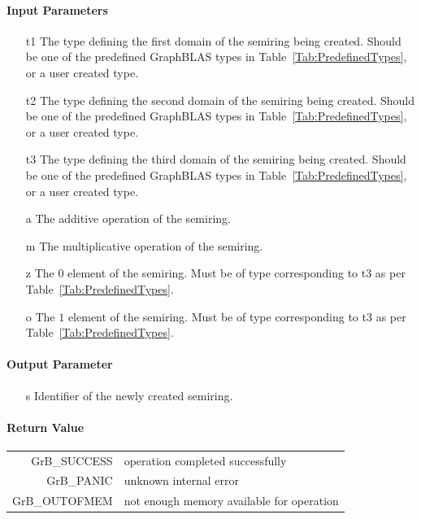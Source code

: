 \documentclass[11pt]{extarticle}
\begin{document}
\paragraph{Input Parameters}

\begin{itemize}
	\item[{\sf t1}] The type defining the first domain of the semiring being created. Should be one of the predefined
	GraphBLAS types in Table~\ref{Tab:PredefinedTypes}, or a user created type.
	\item[{\sf t2}] The type defining the second domain of the semiring being created. Should be one of the predefined
	GraphBLAS types in Table~\ref{Tab:PredefinedTypes}, or a user created type.
	\item[{\sf t3}] The type defining the third domain of the semiring being created. Should be one of the predefined
	GraphBLAS types in Table~\ref{Tab:PredefinedTypes}, or a user created type.
	\item[{\sf a}] The additive operation of the semiring.
	\item[{\sf m}] The multiplicative operation of the semiring.
	\item[{\sf z}] The $0$ element of the semiring. Must be of type corresponding to {\sf t3} as per Table~\ref{Tab:PredefinedTypes}.
	\item[{\sf o}] The $1$ element of the semiring. Must be of type corresponding to {\sf t3} as per Table~\ref{Tab:PredefinedTypes}.
\end{itemize}

\paragraph{Output Parameter}

\begin{itemize}
	\item[{\sf s}] Identifier of the newly created semiring.
\end{itemize}

\paragraph{Return Value}

\begin{tabular}{rl} 
{\sf GrB\_SUCCESS} 	& operation completed successfully \\
{\sf GrB\_PANIC}	& unknown internal error \\
{\sf GrB\_OUTOFMEM}	& not enough memory available for operation \\
\end{tabular}
\end{document}
